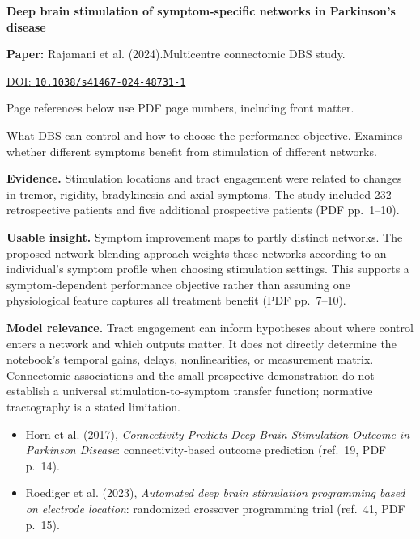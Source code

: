 

{\Large\bfseries Deep brain stimulation of symptom-specific networks in Parkinson's disease\par}

\textbf{Paper:} Rajamani et al. (2024).\quad Multicentre connectomic DBS study.\par
\href{https://doi.org/10.1038/s41467-024-48731-1}{DOI: \nolinkurl{10.1038/s41467-024-48731-1}}\par
{\footnotesize Page references below use PDF page numbers, including front matter.}

What DBS can control and how to choose the performance objective. Examines whether different symptoms benefit from stimulation of different networks.

\textbf{Evidence.} Stimulation locations and tract engagement were related to changes in tremor, rigidity, bradykinesia and axial symptoms. The study included 232 retrospective patients and five additional prospective patients (PDF pp.~1--10).

\textbf{Usable insight.} Symptom improvement maps to partly distinct networks. The proposed network-blending approach weights these networks according to an individual's symptom profile when choosing stimulation settings. This supports a symptom-dependent performance objective rather than assuming one physiological feature captures all treatment benefit (PDF pp.~7--10).

\textbf{Model relevance.} Tract engagement can inform hypotheses about where control enters a network and which outputs matter. It does not directly determine the notebook's temporal gains, delays, nonlinearities, or measurement matrix. Connectomic associations and the small prospective demonstration do not establish a universal stimulation-to-symptom transfer function; normative tractography is a stated limitation.

\begin{itemize}
\item Horn et al. (2017), \emph{Connectivity Predicts Deep Brain Stimulation Outcome in Parkinson Disease}: connectivity-based outcome prediction (ref.~19, PDF p.~14).
\item Roediger et al. (2023), \emph{Automated deep brain stimulation programming based on electrode location}: randomized crossover programming trial (ref.~41, PDF p.~15).
\end{itemize}


